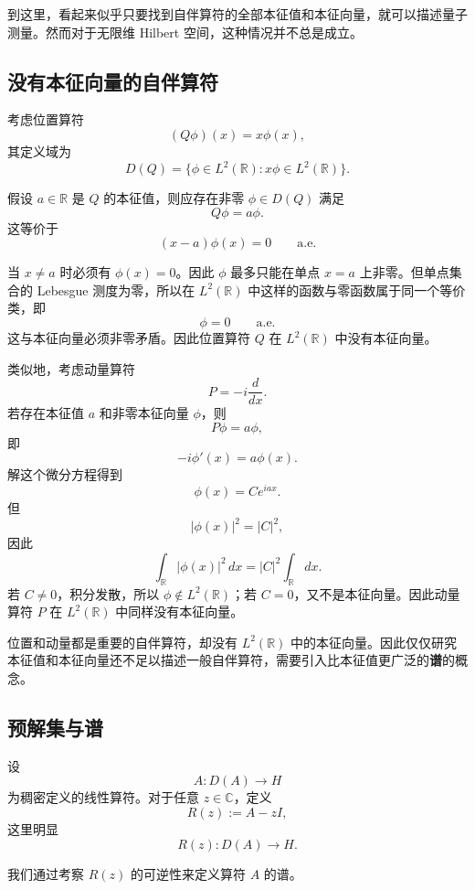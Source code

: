 \documentclass[UTF8,a4paper,11pt,openany]{ctexbook}
\begin{document}
到这里，看起来似乎只要找到自伴算符的全部本征值和本征向量，就可以描述量子测量。然而对于无限维 Hilbert 空间，这种情况并不总是成立。

\subsection{没有本征向量的自伴算符}

考虑位置算符
\[
(Q\phi)(x)=x\phi(x),
\]
其定义域为
\[
D(Q)
=
\{\phi\in L^2(\mathbb R):x\phi\in L^2(\mathbb R)\}.
\]

假设 $a\in\mathbb R$ 是 $Q$ 的本征值，则应存在非零
$\phi\in D(Q)$ 满足
\[
Q\phi=a\phi.
\]
这等价于
\begin{equation}
    (x-a)\phi(x)=0
    \qquad
    \text{a.e.}
\end{equation}

当 $x\neq a$ 时必须有 $\phi(x)=0$。因此 $\phi$ 最多只能在单点
$x=a$ 上非零。但单点集合的 Lebesgue 测度为零，所以在
$L^2(\mathbb R)$ 中这样的函数与零函数属于同一个等价类，即
\[
\phi=0
\qquad
\text{a.e.}
\]
这与本征向量必须非零矛盾。因此位置算符 $Q$ 在
$L^2(\mathbb R)$ 中没有本征向量。

类似地，考虑动量算符
\[
P=-i\frac{d}{dx}.
\]
若存在本征值 $a$ 和非零本征向量 $\phi$，则
\[
P\phi=a\phi,
\]
即
\begin{equation}
    -i\phi'(x)=a\phi(x).
\end{equation}
解这个微分方程得到
\[
\phi(x)=Ce^{iax}.
\]
但
\[
|\phi(x)|^2=|C|^2,
\]
因此
\[
\int_{\mathbb R}|\phi(x)|^2\,dx
=
|C|^2\int_{\mathbb R}dx.
\]
若 $C\neq0$，积分发散，所以 $\phi\notin L^2(\mathbb R)$；若
$C=0$，又不是本征向量。因此动量算符 $P$ 在
$L^2(\mathbb R)$ 中同样没有本征向量。

位置和动量都是重要的自伴算符，却没有 $L^2(\mathbb R)$ 中的本征向量。因此仅仅研究本征值和本征向量还不足以描述一般自伴算符，需要引入比本征值更广泛的\textbf{谱}的概念。

\subsection{预解集与谱}

设
\[
A:D(A)\to H
\]
为稠密定义的线性算符。对于任意 $z\in\mathbb C$，定义
\begin{equation}
    R(z)
    :=
    A-zI,
\end{equation}
这里明显
\[
R(z):D(A)\to H.
\]

我们通过考察 $R(z)$ 的可逆性来定义算符 $A$ 的谱。
\end{document}
